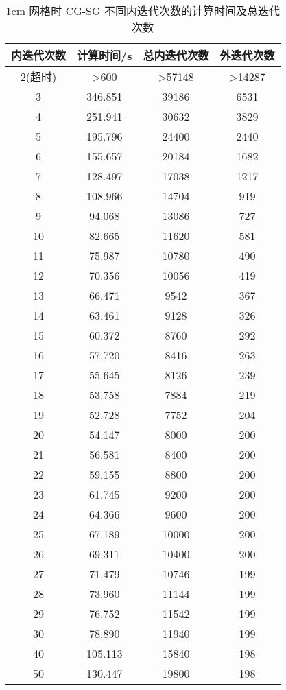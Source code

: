 \begin{datasheet}
\begin{table}
\centering
\caption{1cm 网格时 CG-SG 不同内迭代次数的计算时间及总迭代次数}
\label{tab:equsolve.iter.cg-sg.1cm}
\small
\begin{tabular}{cccc}
\toprule
内迭代次数 & 计算时间/s & 总内迭代次数 & 外迭代次数\\
\midrule
2(超时) & >600 & >57148 & >14287 \\ %
3 & 346.851 & 39186 & 6531\\
4 & 251.941 & 30632 & 3829\\
5 & 195.796 & 24400 & 2440\\
6 & 155.657 & 20184 & 1682\\
7 & 128.497 & 17038 & 1217\\
8 & 108.966 & 14704 & 919\\
9 & 94.068 & 13086 & 727\\
10 & 82.665 & 11620 & 581\\
11 & 75.987 & 10780 & 490\\
12 & 70.356 & 10056 & 419\\
13 & 66.471 & 9542 & 367\\
14 & 63.461 & 9128 & 326\\
15 & 60.372 & 8760 & 292\\
16 & 57.720 & 8416 & 263\\
17 & 55.645 & 8126 & 239\\
18 & 53.758 & 7884 & 219\\
19 & 52.728 & 7752 & 204\\
20 & 54.147 & 8000 & 200\\
21 & 56.581 & 8400 & 200\\
22 & 59.155 & 8800 & 200\\
23 & 61.745 & 9200 & 200\\
24 & 64.366 & 9600 & 200\\
25 & 67.189 & 10000 & 200\\
26 & 69.311 & 10400 & 200\\
27 & 71.479 & 10746 & 199\\
28 & 73.960 & 11144 & 199\\
29 & 76.752 & 11542 & 199\\
30 & 78.890 & 11940 & 199\\
40 & 105.113 & 15840 & 198\\
50 & 130.447 & 19800 & 198\\
\bottomrule
\end{tabular}
\end{table}

\end{datasheet}

